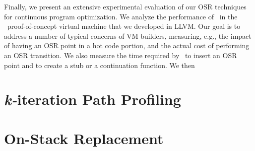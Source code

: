Finally, we present an extensive experimental evaluation of our OSR techniques for continuous program optimization. We analyze the performance of \osrkit\ in the \tinyvm\ proof-of-concept virtual machine that we developed in LLVM. Our goal is to address a number of typical concerns of VM builders, measuring, e.g., the impact of having an OSR point in a hot code portion, and the actual cost of performing an OSR transition. We also measure the time required by \osrkit\ to insert an OSR point and to create a stub or a continuation function. We then \missing



\section{{\em k-}iteration Path Profiling}

\section{On-Stack Replacement}
